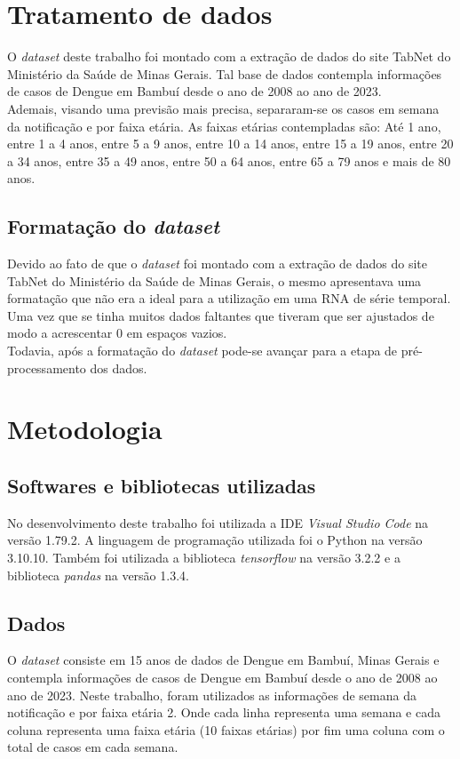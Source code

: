 \documentclass[
	article,			%
	12pt,				%
	a4paper,			%
	chapter=TITLE,		%
	section=TITLE,		%
	subsection=TITLE,	%
	subsubsection=TITLE %
	english,			%
	brazil,				%
	sumario=tradicional
	]{abntex2}
\begin{document}
\section{Tratamento de dados}
O \textit{dataset} deste trabalho foi montado com a extração de dados do site TabNet do Ministério da Saúde de Minas Gerais. Tal base de dados contempla informações de casos de Dengue em Bambuí desde o ano de 2008 ao ano de 2023. 
\\ \indent Ademais, visando uma previsão mais precisa, separaram-se os casos em semana da notificação e por faixa etária. 
As faixas etárias contempladas são: Até 1 ano, entre 1 a 4 anos, entre 5 a 9 anos, entre 10 a 14 anos, entre 15 a 19 anos, entre 20 a 34 anos, entre 35 a 49 anos, entre 50 a 64 anos, entre 65 a 79 anos e mais de 80 anos.
\subsection{Formatação do \textit{dataset}}
Devido ao fato de que o \textit{dataset} foi montado com a extração de dados do site TabNet do Ministério da Saúde de Minas Gerais, o mesmo apresentava uma formatação que não era a ideal para a utilização em uma RNA de série temporal. Uma vez que se tinha muitos dados faltantes que tiveram que ser ajustados de modo a acrescentar 0 em espaços vazios.
\\ \indent
Todavia, após a formatação do \textit{dataset} pode-se avançar para a etapa de pré-processamento dos dados.


\section{Metodologia}
\subsection{Softwares e bibliotecas utilizadas}
No desenvolvimento deste trabalho foi utilizada a IDE \textit{Visual Studio Code} na versão 1.79.2. A linguagem de programação utilizada foi o Python na versão 3.10.10. 
Também foi utilizada a biblioteca \textit{tensorflow} na versão 3.2.2 e a biblioteca \textit{pandas} na versão 1.3.4. 

\subsection{Dados}
O \textit{dataset} consiste em 15 anos de dados de Dengue em Bambuí, Minas Gerais e contempla informações de casos de Dengue em Bambuí desde o ano de 2008 ao ano de 2023. Neste trabalho, foram utilizados as informações de semana da notificação e por faixa etária 2. Onde cada linha representa uma semana e cada coluna representa uma faixa etária (10 faixas etárias) por fim uma coluna com o total de casos em cada semana.
\end{document}
